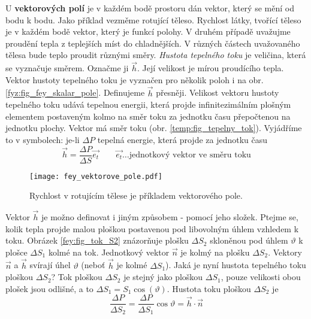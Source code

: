       U \textbf{vektorových polí} je v každém bodě prostoru dán vektor, který se mění od bodu k 
      bodu. Jako příklad vezměme rotující těleso. Rychlost látky, tvořící těleso je v každém bodě 
      vektor, který je funkcí polohy. V druhém případě uvažujme proudění tepla z teplejších míst do 
      chladnějších. V různých částech uvažovaného tělesa bude teplo proudit různými směry. 
      \emph{Hustota tepelného toku} je veličina, která se vyznačuje směrem. Označme ji $\vec{h}$. 
      Její velikost je mírou proudícího tepla. Vektor hustoty tepelného toku je vyznačen pro několik 
      poloh i na obr. \ref{fyz:fig_fey_skalar_pole}. Definujeme $\vec{h}$ přesněji. Velikost vektoru 
      hustoty tepelného toku udává tepelnou energii, která projde infinitezimálním plošným elementem 
      postaveným kolmo na směr toku za jednotku času přepočtenou na  jednotku plochy. Vektor má směr 
      toku (obr. \ref{temp:fig_tepelny_tok}). Vyjádříme to v symbolech: je-li $\Delta P$ tepelná 
      energie, která projde za jednotku času
      \begin{equation}\label{temp:eq_tepelny_tok}
       \vec{h}=\frac{\Delta P}{\Delta S}\vec{e_t}
               \qquad \vec{e_t}\ldots\text{jednotkový vektor ve směru toku}
      \end{equation}   

      \begin{figure}
       \centering
       \texttt{[image: fey\_vektorove\_pole.pdf]}
       \caption{Rychlost v rotujícím tělese je příkladem vektorového pole.}  
       \label{temp:fig_fey_pr_vektorove_pole} 
      \end{figure}
            
      Vektor $\vec{h}$ je možno definovat i jiným způsobem - pomocí jeho složek. Ptejme se, kolik 
      tepla projde malou ploškou postavenou pod libovolným úhlem vzhledem k toku. Obrázek 
      \ref{fey:fig_tok_S2} znázorňuje plošku $\Delta S_2$ skloněnou pod úhlem $\vartheta$ k plošce 
      $\Delta S_1$ kolmé na tok. Jednotkový vektor $\vec{n}$ je kolmý na plošku $\Delta S_2$. 
      Vektory $\vec{n}$ a $\vec{h}$ svírají úhel $\vartheta$ (neboť $\vec{h}$ je kolmé $\Delta 
      S_1$). Jaká je nyní hustota tepelného toku ploškou $\Delta S_2$? Tok ploškou $\Delta S_2$ je 
      stejný jako ploškou $\Delta S_1$, pouze velikosti obou plošek jsou odlišné, a to $\Delta 
      S_1=S_1\cos(\vartheta)$. Hustota toku ploškou $\Delta S_2$ je 
      \begin{equation}\label{temp:eq_tok_ploskou_S2}
       \frac{\Delta P}{\Delta S_2}=\frac{\Delta P}{\Delta S_1}\cos{\vartheta}=\vec{h}\cdot\vec{n}
      \end{equation}
      
